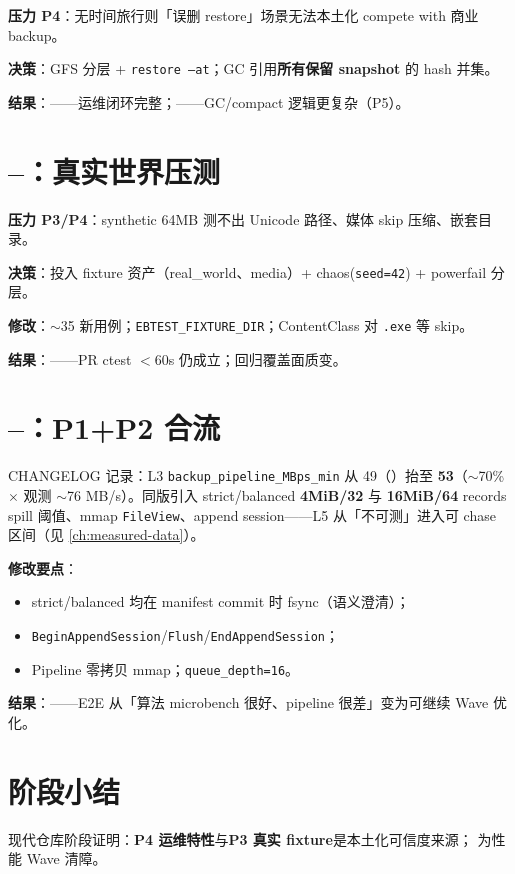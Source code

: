 \textbf{压力 P4}：无时间旅行则「误删 restore」场景无法本土化 compete with 商业 backup。

\textbf{决策}：GFS 分层 + \texttt{restore --at}；GC 引用\textbf{所有保留 snapshot} 的 hash 并集。

\textbf{结果}：——运维闭环完整；——GC/compact 逻辑更复杂（P5）。

\section{--：真实世界压测}

\textbf{压力 P3/P4}：synthetic 64MB 测不出 Unicode 路径、媒体 skip 压缩、嵌套目录。

\textbf{决策}：投入 fixture 资产（real\_world、media）+ chaos(\texttt{seed=42}) + powerfail 分层。

\textbf{修改}：$\sim$35 新用例；\texttt{EBTEST\_FIXTURE\_DIR}；ContentClass 对 \texttt{.exe} 等 skip。

\textbf{结果}：——PR ctest $<$60s 仍成立；回归覆盖面质变。

\section{--：P1+P2 合流}

\begin{pressbox}[v0.4.6 是本土化分水岭]
CHANGELOG 记录：L3 \texttt{backup\_pipeline\_MBps\_min} 从 49（）抬至 \textbf{53}（$\sim$70\% $\times$ 观测 $\sim$76 MB/s）。同版引入 strict/balanced \textbf{4MiB/32} 与 \textbf{16MiB/64} records spill 阈值、mmap \texttt{FileView}、append session——L5 从「不可测」进入可 chase 区间（见 \cref{ch:measured-data}）。
\end{pressbox}

\textbf{修改要点}：
\begin{itemize}[nosep]
  \item strict/balanced 均在 manifest commit 时 fsync（语义澄清）；
  \item \texttt{BeginAppendSession}/\texttt{Flush}/\texttt{EndAppendSession}；
  \item Pipeline 零拷贝 mmap；\texttt{queue\_depth=16}。
\end{itemize}

\textbf{结果}：——E2E 从「算法 microbench 很好、pipeline 很差」变为可继续 Wave 优化。

\section{阶段小结}

现代仓库阶段证明：\textbf{P4 运维特性}与\textbf{P3 真实 fixture}是本土化可信度来源； 为性能 Wave 清障。
